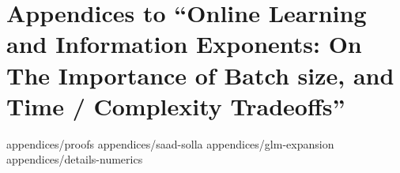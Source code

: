 \chapter[Information Exponents and Batch size / complexity]{Appendices to ``Online Learning and Information Exponents: On The Importance of Batch size, and Time / Complexity Tradeoffs''}
\label{chap:appendix-2406}

{appendices/proofs}
{appendices/saad-solla}
{appendices/glm-expansion}
{appendices/details-numerics}
